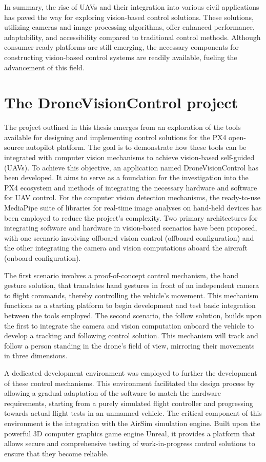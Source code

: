 In summary, the rise of UAVs and their integration into various civil applications has paved the way for exploring vision-based control solutions. These solutions, utilizing cameras and image processing algorithms, offer enhanced performance, adaptability, and accessibility compared to traditional control methods. Although consumer-ready platforms are still emerging, the necessary components for constructing vision-based control systems are readily available, fueling the advancement of this field.

\section{The DroneVisionControl project}


The project outlined in this thesis emerges from an exploration of the tools available for designing and implementing control solutions for the PX4 open-source autopilot platform. The goal is to demonstrate how these tools can be integrated with computer vision mechanisms to achieve vision-based self-guided (UAVs).
To achieve this objective, an application named DroneVisionControl has been developed. It aims to serve as a foundation for the investigation into the PX4 ecosystem and methods of integrating the necessary hardware and software for UAV control.
For the computer vision detection mechanisms, the ready-to-use MediaPipe suite of libraries for real-time image analyses on hand-held devices has been employed to reduce the project's complexity.
Two primary architectures for integrating software and hardware in vision-based scenarios have been proposed, with one scenario involving offboard vision control (offboard configuration) and the other integrating the camera and vision computations aboard the aircraft (onboard configuration).

The first scenario involves a proof-of-concept control mechanism, the hand gesture solution, that translates hand gestures in front of an independent camera to flight commands, thereby controlling the vehicle's movement. This mechanism functions as a starting platform to begin development and test basic integration between the tools employed.
The second scenario, the follow solution, builds upon the first to integrate the camera and vision computation onboard the vehicle to develop a tracking and following control solution. This mechanism will track and follow a person standing in the drone's field of view, mirroring their movements in three dimensions.

A dedicated development environment was employed to further the development of these control mechanisms. This environment facilitated the design process by allowing a gradual adaptation of the software to match the hardware requirements, starting from a purely simulated flight controller and progressing towards actual flight tests in an unmanned vehicle.
The critical component of this environment is the integration with the AirSim simulation engine. Built upon the powerful 3D computer graphics game engine Unreal, it provides a platform that allows secure and comprehensive testing of work-in-progress control solutions to ensure that they become reliable.

